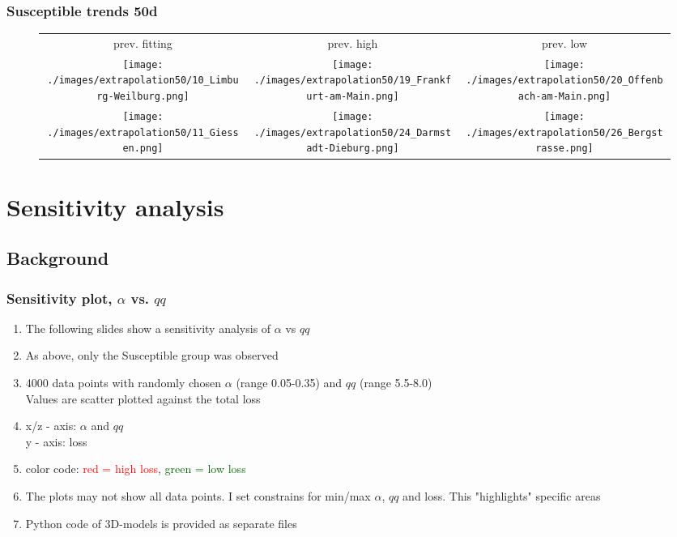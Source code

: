 \documentclass{beamer}
\begin{document}
\begin{frame}
	\frametitle{Susceptible trends 50d}
	\begin{center}
		\begin{figure}
			\begin{adjustwidth}{-0.8cm}{}
			\begin{tabular}{ccc}
				prev. fitting & prev. high & prev. low \\
				\texttt{[image: ./images/extrapolation50/10\_Limburg-Weilburg.png]}
					& \texttt{[image: ./images/extrapolation50/19\_Frankfurt-am-Main.png]}
					& \texttt{[image: ./images/extrapolation50/20\_Offenbach-am-Main.png]} \\
				\texttt{[image: ./images/extrapolation50/11\_Giessen.png]}
					& \texttt{[image: ./images/extrapolation50/24\_Darmstadt-Dieburg.png]}
					& \texttt{[image: ./images/extrapolation50/26\_Bergstrasse.png]}
			\end{tabular}
			\end{adjustwidth}
		\end{figure}
	\end{center}
\end{frame}



\section{Sensitivity analysis}
\subsection{Background}
\begin{frame}
	\frametitle{Sensitivity plot, $\alpha$ vs. $qq$}
	\begin{enumerate}[$\bullet$]
		\item The following slides show a sensitivity analysis of $\alpha$ vs $qq$
		\item As above, only the Susceptible group was observed
		\item 4000 data points with randomly chosen $\alpha$ (range 0.05-0.35) and $qq$ (range 5.5-8.0)\\Values are scatter plotted against the total loss
		\item x/z - axis: $\alpha$ and $qq$\\
			y - axis: loss
		\item color code: \textcolor{red}{red = high loss}, \textcolor{darkgreen}{green = low loss}
		\item The plots may not show all data points. I set constrains for min/max $\alpha$, $qq$ and loss.
			This "highlights" specific areas
		\item Python code of 3D-models is provided as separate files
	\end{enumerate}
\end{frame}
\end{document}
